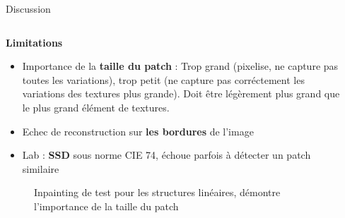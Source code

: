 \documentclass[final,hyperref={pdfpagelabels=false}]{beamer}
\begin{document}
\begin{frame}[t]
\begin{columns}[t]
\end{columns}

\begin{columns}[t]
\begin{column}{.02\textwidth} \end{column}
\begin{column}{.930\textwidth} 
\begin{block}{\Large Discussion}
\begin{columns}[t]
\begin{column}{.496\textwidth}
\textbf{Limitations}
\begin{itemize}
\item Importance de la \textbf{taille du patch} : Trop grand (pixelise, ne capture pas toutes les variations), trop petit (ne capture pas corréctement les variations des textures plus grande). Doit être légèrement plus grand que le plus grand élément de textures. 
\item Echec de reconstruction sur \textbf{les bordures} de l'image
\item Lab : \textbf{SSD} sous norme CIE 74, échoue parfois à détecter un patch similaire
\end{itemize}


\begin{figure}[H]
\centering
{}
\caption{Inpainting de test pour les structures linéaires, démontre l'importance de la taille du patch}
\end{figure}


\end{column}
\end{columns}
\end{block}
\end{column}
\end{columns}
\end{frame}
\end{document}
